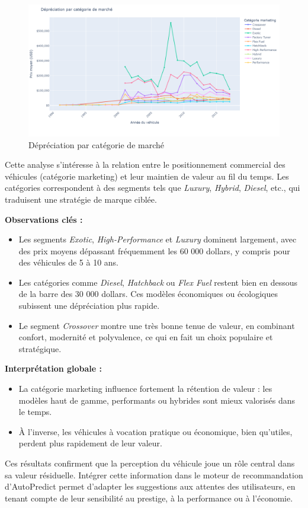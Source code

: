 \documentclass[12pt]{report}
\begin{document}
\begin{figure}[H]
    \centering
    \includegraphics[width=1\textwidth]{annee_prix_cat.png}
    \caption{Dépréciation par catégorie de marché}
    \label{fig:annee-prix-cat}
\end{figure}
Cette analyse s’intéresse à la relation entre le positionnement commercial des véhicules (catégorie marketing) et leur maintien de valeur au fil du temps. Les catégories correspondent à des segments tels que \textit{Luxury}, \textit{Hybrid}, \textit{Diesel}, etc., qui traduisent une stratégie de marque ciblée.

\vspace{0.5em}
\textbf{Observations clés :}
\begin{itemize}
    \item Les segments \textit{Exotic}, \textit{High-Performance} et \textit{Luxury} dominent largement, avec des prix moyens dépassant fréquemment les 60 000 dollars, y compris pour des véhicules de 5 à 10 ans.
    \item Les catégories comme \textit{Diesel}, \textit{Hatchback} ou \textit{Flex Fuel} restent bien en dessous de la barre des 30 000 dollars. Ces modèles économiques ou écologiques subissent une dépréciation plus rapide.
    \item Le segment \textit{Crossover} montre une très bonne tenue de valeur, en combinant confort, modernité et polyvalence, ce qui en fait un choix populaire et stratégique.
\end{itemize}

\vspace{0.5em}
\textbf{Interprétation globale :}
\begin{itemize}
    \item La catégorie marketing influence fortement la rétention de valeur : les modèles haut de gamme, performants ou hybrides sont mieux valorisés dans le temps.
    \item À l’inverse, les véhicules à vocation pratique ou économique, bien qu’utiles, perdent plus rapidement de leur valeur.
\end{itemize}

\vspace{1em}
Ces résultats confirment que la perception du véhicule joue un rôle central dans sa valeur résiduelle. Intégrer cette information dans le moteur de recommandation d'AutoPredict permet d’adapter les suggestions aux attentes des utilisateurs, en tenant compte de leur sensibilité au prestige, à la performance ou à l’économie.
\end{document}
